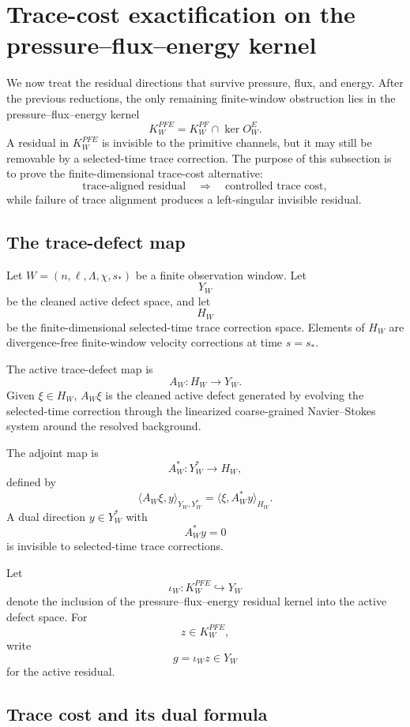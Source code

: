 \documentclass[11pt]{article}
\numberwithin{equation}{section}
\theoremstyle{plain}
\theoremstyle{definition}
\theoremstyle{remark}
\begin{document}
\section{Trace-cost exactification on the pressure--flux--energy kernel}
\label{subsec:trace-cost-exactification}

We now treat the residual directions that survive pressure, flux, and energy.
After the previous reductions, the only remaining finite-window obstruction lies
in the pressure--flux--energy kernel
\[
        K^{PFE}_W
        =
        K^{PF}_W\cap \ker O^E_W .
\]
A residual in \(K^{PFE}_W\) is invisible to the primitive channels, but it may
still be removable by a selected-time trace correction.  The purpose of this
subsection is to prove the finite-dimensional trace-cost alternative:
\[
        \text{trace-aligned residual}
        \quad\Longrightarrow\quad
        \text{controlled trace cost},
\]
while failure of trace alignment produces a left-singular invisible residual.

\subsection{The trace-defect map}

Let \(W=(n,\ell,\Lambda,\chi,s_*)\) be a finite observation window.  Let
\[
        Y_W
\]
be the cleaned active defect space, and let
\[
        H_W
\]
be the finite-dimensional selected-time trace correction space.  Elements of
\(H_W\) are divergence-free finite-window velocity corrections at time
\(s=s_*\).

The active trace-defect map is
\[
        A_W:H_W\longrightarrow Y_W .
\]
Given \(\xi\in H_W\), \(A_W\xi\) is the cleaned active defect generated by
evolving the selected-time correction through the linearized coarse-grained
Navier--Stokes system around the resolved background.

The adjoint map is
\[
        A_W^*:Y_W^*\longrightarrow H_W,
\]
defined by
\[
        \langle A_W\xi,y\rangle_{Y_W,Y_W^*}
        =
        \langle \xi,A_W^*y\rangle_{H_W}.
\]
A dual direction \(y\in Y_W^*\) with
\[
        A_W^*y=0
\]
is invisible to selected-time trace corrections.

Let
\[
        \iota_W:K^{PFE}_W\hookrightarrow Y_W
\]
denote the inclusion of the pressure--flux--energy residual kernel into the
active defect space.  For
\[
        z\in K^{PFE}_W,
\]
write
\[
        g=\iota_W z\in Y_W
\]
for the active residual.

\subsection{Trace cost and its dual formula}
\end{document}
